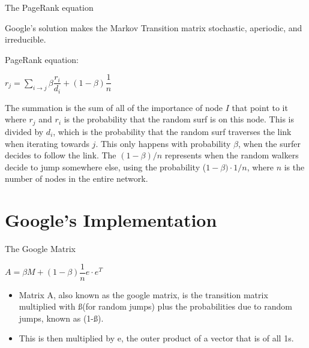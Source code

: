 \documentclass{beamer}
\begin{document}
\begin{frame}[t]{The PageRank equation}
\begin{outline}
\1 Google's solution makes the Markov Transition matrix stochastic, aperiodic, and irreducible.

\1 PageRank equation:

\begin{mdframed}[backgroundcolor=blue!20]
    \begin{center}
        $r_j = \sum\limits_{i\to j}\beta \dfrac{r_i}{d_i} + (1-\beta)\dfrac{1}{n}$
    \end{center}
\end{mdframed}

\2 The summation is the sum of all of the importance of node $I$ that point to it where $r_j$ and $r_i$ is the probability that the random surf is on this node.
\2 This is divided by $d_i$, which is the probability that the random surf traverses the link when iterating towards $j$. This only happens with probability $\beta$, when the surfer decides to follow the link.
\2 The $(1-\beta)/n$ represents when the random walkers decide to jump somewhere else, using the probability ($1-\beta) \cdot 1/n$, where $n$ is the number of nodes in the entire network.
\end{outline}
\end{frame}

\section{Google's Implementation}
\begin{frame}[t]{The Google Matrix}
    \begin{mdframed}[backgroundcolor=blue!20]
        \begin{center}
            $A = \beta M + (1-\beta)\dfrac{1}{n}e\cdot e^T$
        \end{center}
    \end{mdframed}
    \begin{itemize}
       
        \item Matrix A, also known as the google matrix, is the transition matrix multiplied with ß(for random jumps) plus the probabilities due to random jumps, known as (1-ß). 
    
    
    \item This is then multiplied by e, the outer product of a vector that is of all 1s.
    \end{itemize}
    \end{frame}
\end{document}
